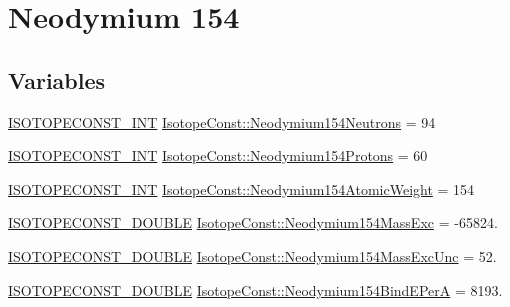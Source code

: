 \hypertarget{group___isotope_const-_neodymium-_nd154}{}\section{Neodymium 154}
\label{group___isotope_const-_neodymium-_nd154}
\subsection*{Variables}
\begin{DoxyCompactItemize}
\item 
\mbox{\hyperlink{group___isotope_const-_macros_ga5f18360b3e99483a35c32d789e62621c}{I\+S\+O\+T\+O\+P\+E\+C\+O\+N\+S\+T\+\_\+\+I\+NT}} \mbox{\hyperlink{group___isotope_const-_neodymium-_nd154_ga9a63ce0e6e93c52af6ef9e2207524c82}{Isotope\+Const\+::\+Neodymium154\+Neutrons}} = 94
\item 
\mbox{\hyperlink{group___isotope_const-_macros_ga5f18360b3e99483a35c32d789e62621c}{I\+S\+O\+T\+O\+P\+E\+C\+O\+N\+S\+T\+\_\+\+I\+NT}} \mbox{\hyperlink{group___isotope_const-_neodymium-_nd154_ga77b783b2151461904b3f9f3b9b951ce9}{Isotope\+Const\+::\+Neodymium154\+Protons}} = 60
\item 
\mbox{\hyperlink{group___isotope_const-_macros_ga5f18360b3e99483a35c32d789e62621c}{I\+S\+O\+T\+O\+P\+E\+C\+O\+N\+S\+T\+\_\+\+I\+NT}} \mbox{\hyperlink{group___isotope_const-_neodymium-_nd154_ga3ceddd507ff82d3772be031e0a226cab}{Isotope\+Const\+::\+Neodymium154\+Atomic\+Weight}} = 154
\item 
\mbox{\hyperlink{group___isotope_const-_macros_ga8f45a7272ce02c0b4c65c44636ed719a}{I\+S\+O\+T\+O\+P\+E\+C\+O\+N\+S\+T\+\_\+\+D\+O\+U\+B\+LE}} \mbox{\hyperlink{group___isotope_const-_neodymium-_nd154_ga8da99cd6d82a6b21cb20a52b7541b6d1}{Isotope\+Const\+::\+Neodymium154\+Mass\+Exc}} = -\/65824.
\item 
\mbox{\hyperlink{group___isotope_const-_macros_ga8f45a7272ce02c0b4c65c44636ed719a}{I\+S\+O\+T\+O\+P\+E\+C\+O\+N\+S\+T\+\_\+\+D\+O\+U\+B\+LE}} \mbox{\hyperlink{group___isotope_const-_neodymium-_nd154_ga3363a068100557d0dcfbd4c7c9bb247f}{Isotope\+Const\+::\+Neodymium154\+Mass\+Exc\+Unc}} = 52.
\item 
\mbox{\hyperlink{group___isotope_const-_macros_ga8f45a7272ce02c0b4c65c44636ed719a}{I\+S\+O\+T\+O\+P\+E\+C\+O\+N\+S\+T\+\_\+\+D\+O\+U\+B\+LE}} \mbox{\hyperlink{group___isotope_const-_neodymium-_nd154_gad50890ba5a826b5d0f202837a1d9bf76}{Isotope\+Const\+::\+Neodymium154\+Bind\+E\+PerA}} = 8193.
\item 

\end{DoxyCompactItemize}
